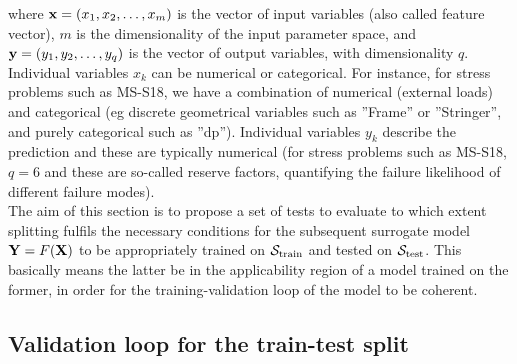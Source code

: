 where ${\bf x}=(x_1,x_2,\dots,x_m)$ is the vector of input variables (also called feature vector), $m$ is the dimensionality of the input parameter space, and ${\bf y}=(y_1,y_2,\dots,y_q)$ is the vector of output variables, with dimensionality $q$. Individual variables $x_k$ can be numerical or categorical. For instance, for stress problems such as MS-S18, we have a combination of numerical  (\eg external loads) and categorical (eg discrete geometrical variables such as ''Frame'' or ''Stringer'', and purely categorical such as ''dp''). Individual variables $y_k$ describe the prediction and these are typically numerical (for stress problems such as MS-S18, $q=6$ and these are so-called reserve factors, quantifying the failure likelihood of different failure modes).\\
%
\indent The aim of this section is to propose a set of tests to evaluate to which extent splitting fulfils the necessary conditions for the subsequent surrogate model ${\bf {Y}}={F}({\bf X})$ to be appropriately trained on ${\cal S}_{\text{train}}$ and tested on ${\cal S}_{\text{test}}$. This basically means the latter be in the applicability region of a model trained on the former, in order for the training-validation loop of the model to be coherent.\\
%
\subsection{Validation loop for the train-test split}
